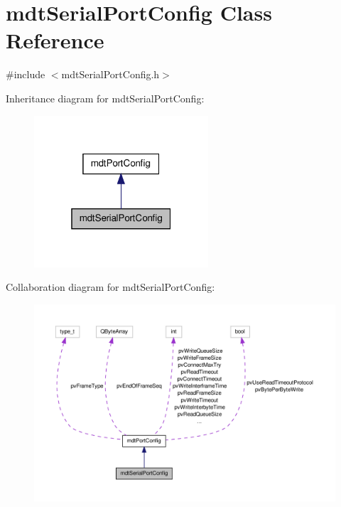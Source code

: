 \hypertarget{classmdt_serial_port_config}{\section{mdt\-Serial\-Port\-Config Class Reference}
\label{classmdt_serial_port_config}
}


{\ttfamily \#include $<$mdt\-Serial\-Port\-Config.\-h$>$}



Inheritance diagram for mdt\-Serial\-Port\-Config\-:
\nopagebreak
\begin{figure}[H]
\begin{center}
\leavevmode
\includegraphics[width=184pt]{classmdt_serial_port_config__inherit__graph}
\end{center}
\end{figure}


Collaboration diagram for mdt\-Serial\-Port\-Config\-:
\nopagebreak
\begin{figure}[H]
\begin{center}
\leavevmode
\includegraphics[width=350pt]{classmdt_serial_port_config__coll__graph}
\end{center}
\end{figure}
